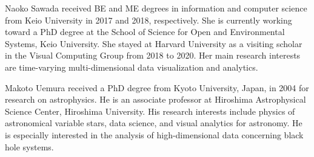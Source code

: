 \documentclass[10pt,journal,compsoc]{IEEEtran}
\begin{document}
% 







% 

\begin{IEEEbiography}{Naoko Sawada}
received BE and ME degrees in information and computer science from Keio University in 2017 and 2018, respectively. 
She is currently working toward a PhD degree 
at the School of Science for Open and Environmental Systems, Keio University.
She stayed at Harvard University as a visiting scholar in the Visual Computing Group from 2018 to 2020.
Her main research interests are time-varying multi-dimensional data visualization and analytics.
\end{IEEEbiography}

\begin{IEEEbiography}{Makoto Uemura}
received a PhD degree from 
Kyoto University, Japan, in 2004 for research on
astrophysics. He is an associate professor at 
Hiroshima Astrophysical Science Center, 
Hiroshima University. His research interests include
physics of astronomical variable stars, data science, 
and visual analytics for astronomy. He is especially 
interested in the analysis of high-dimensional data 
concerning black hole systems. 
\end{IEEEbiography}
\end{document}
